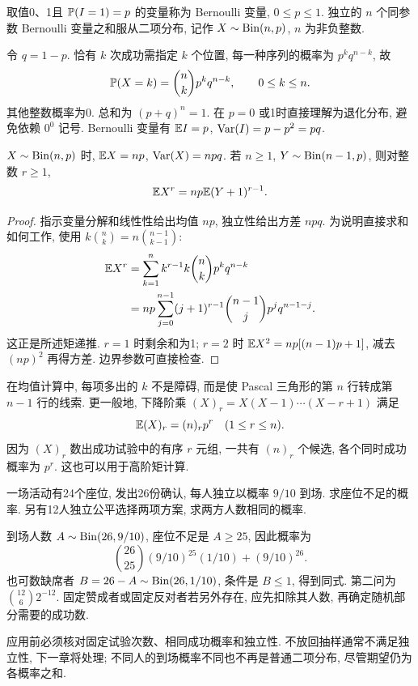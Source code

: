 \begin{definition}
取值0、1且 $\mathbb P(I=1)=p$ 的变量称为 Bernoulli 变量, $0\le p\le1$. 独立的 $n$ 个同参数 Bernoulli 变量之和服从二项分布, 记作 $X\sim\operatorname{Bin}(n,p)$, $n$ 为非负整数.
\end{definition}
令 $q=1-p$. 恰有 $k$ 次成功需指定 $k$ 个位置, 每一种序列的概率为 $p^kq^{n-k}$, 故
\[
\mathbb P(X=k)=\binom nkp^kq^{n-k},\qquad0\le k\le n.
\]
其他整数概率为0. 总和为 $(p+q)^n=1$. 在 $p=0$ 或1时直接理解为退化分布, 避免依赖 $0^0$ 记号. Bernoulli 变量有 $\mathbb E I=p$, $\operatorname{Var}(I)=p-p^2=pq$.

\begin{theorem}
$X\sim\operatorname{Bin}(n,p)$ 时, $\mathbb E X=np$, $\operatorname{Var}(X)=npq$. 若 $n\ge1$, $Y\sim\operatorname{Bin}(n-1,p)$, 则对整数 $r\ge1$,
\[
\mathbb E X^r=np\mathbb E(Y+1)^{r-1}.
\]
\end{theorem}
\begin{proof}
指示变量分解和线性性给出均值 $np$, 独立性给出方差 $npq$. 为说明直接求和如何工作, 使用
$k\binom nk=n\binom{n-1}{k-1}$:
\begin{align*}
\mathbb E X^r
&=\sum_{k=1}^nk^{r-1}k\binom nkp^kq^{n-k}\\
&=np\sum_{j=0}^{n-1}(j+1)^{r-1}\binom{n-1}{j}p^jq^{n-1-j}.
\end{align*}
这正是所述矩递推. $r=1$ 时剩余和为1; $r=2$ 时 $\mathbb E X^2=np[(n-1)p+1]$, 减去 $(np)^2$ 再得方差. 边界参数可直接检查.
\end{proof}
在均值计算中, 每项多出的 $k$ 不是障碍, 而是使 Pascal 三角形的第 $n$ 行转成第 $n-1$ 行的线索. 更一般地, 下降阶乘 $(X)_r=X(X-1)\cdots(X-r+1)$ 满足
\[
\mathbb E(X)_r=(n)_rp^r\quad(1\le r\le n).
\]
因为 $(X)_r$ 数出成功试验中的有序 $r$ 元组, 一共有 $(n)_r$ 个候选, 各个同时成功概率为 $p^r$. 这也可以用于高阶矩计算.

\begin{example}
一场活动有24个座位, 发出26份确认, 每人独立以概率 $9/10$ 到场. 求座位不足的概率. 另有12人独立公平选择两项方案, 求两方人数相同的概率.
\end{example}
\begin{solution}
到场人数 $A\sim\operatorname{Bin}(26,9/10)$, 座位不足是 $A\ge25$, 因此概率为
\[
\binom{26}{25}(9/10)^{25}(1/10)+(9/10)^{26}.
\]
也可数缺席者 $B=26-A\sim\operatorname{Bin}(26,1/10)$, 条件是 $B\le1$, 得到同式. 第二问为 $\binom{12}{6}2^{-12}$. 固定赞成者或固定反对者若另外存在, 应先扣除其人数, 再确定随机部分需要的成功数.
\end{solution}
应用前必须核对固定试验次数、相同成功概率和独立性. 不放回抽样通常不满足独立性, 下一章将处理; 不同人的到场概率不同也不再是普通二项分布, 尽管期望仍为各概率之和.

